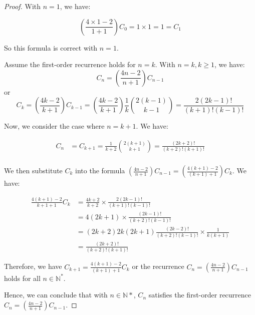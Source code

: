 \documentclass[10pt]{article}
\begin{document}
\begin{enumerate}
\begin{proof}
    With $n=1$, we have:

    $$\left(\frac{4\times 1 -2}{1+1}\right) C_0 = 1 \times 1 = 1 =C_1$$

    So this formula is correct with $n=1$.

    Assume the first-order recurrence holds for $n=k$. With $n = k, k \geq 1$, we have:
    $$C_n = \left(\frac{4n-2}{n+1}\right)C_{n-1}$$
    or 
    $$C_k = \left(\frac{4k-2}{k+1}\right)C_{k-1}= \left(\frac{4k-2}{k+1}\right)\frac{1}{k}\binom{2(k-1)}{k-1}=\frac{2(2k-1)!}{(k+1)!(k-1)!}$$

    Now, we consider the case where $n=k+1$. We have:
    
    \begin{align*}
        C_n &= C_{k+1} =   \frac{1}{k+2}\binom{2(k+1)}{k+1}=\frac{(2k+2)!}{(k+2)!(k+1)!}\\
    \end{align*}

    We then substitute $C_k$ into the formula $\left(\frac{4n-2}{n+1}\right)C_{n-1}=\left(\frac{4(k+1)-2}{(k+1)+1}\right)C_{k}$. We have:

    \begin{align*}
        \frac{4(k+1)-2}{k+1+1}C_{k} &=  \frac{4k+2}{k+2}\times\frac{2(2k-1)!}{(k+1)!(k-1)!}\\
        &=  4(2k+1)\times\frac{(2k-1)!}{(k+2)!(k-1)!}\\
        &=(2k+2)2k(2k+1)\frac{(2k-2)!}{(k+2)!(k-1)!}\times \frac{1}{k(k+1)}\\
        &=\frac{(2k+2)!}{(k+2)!(k+1)!}
    \end{align*}

    Therefore, we have $C_{k+1} = \frac{4(k+1)-2}{(k+1)+1}C_{k}$ or the recurrence $C_n = \left(\frac{4n-2}{n+1}\right)C_{n-1}$ holds for all $n \in \mathbb{N^*}$.

    Hence, we can conclude that with $n \in \mathbb{N*}$, $C_n$ satisfies the first-order recurrence $C_n = \left(\frac{4n-2}{n+1}\right)C_{n-1}.$
\end{proof}
\end{enumerate}
\end{document}
